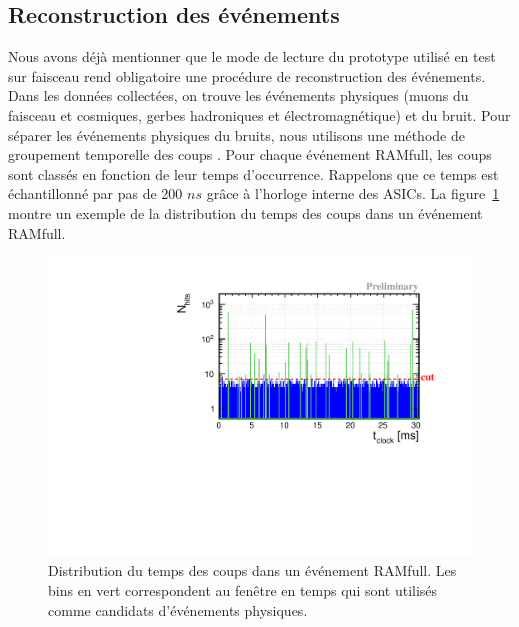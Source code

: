 \subsection{Reconstruction des événements}
\label{sec.trivent}
Nous avons déjà mentionner que le mode de lecture du prototype utilisé en test sur faisceau rend obligatoire une procédure de reconstruction des événements. Dans les données collectées, on trouve les événements physiques (muons du faisceau et cosmiques, gerbes hadroniques et électromagnétique) et du bruit. Pour séparer les événements physiques du bruits, nous utilisons une méthode de groupement temporelle des coups \cite{sdhcal-com}. Pour chaque événement RAMfull, les coups sont classés en fonction de leur temps d’occurrence. Rappelons que ce temps est échantillonné par pas de 200 $ns$ grâce à l'horloge interne des ASICs. La figure~\ref{fig:time_spectrum} montre un exemple de la distribution du temps des coups dans un événement RAMfull. 
\begin{figure}[!h]
  \begin{center}
    \includegraphics[width=.9\textwidth]{SDHCAL/figs/time_spectrum.pdf}
    \caption{Distribution du temps des coups dans un événement RAMfull. Les bins en vert correspondent au fenêtre en temps qui sont utilisés comme candidats d'événements physiques.}
    \label{fig:time_spectrum}
  \end{center}
\end{figure}

